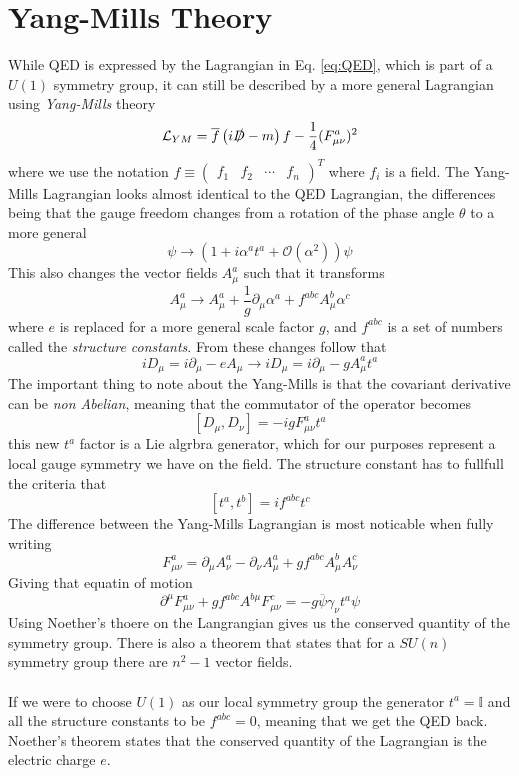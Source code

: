 \documentclass[12pt, a4paper]{book}
\begin{document}
\section{Yang-Mills Theory}
While QED is expressed by the Lagrangian in Eq. \ref{eq:QED}, which is part of a $U(1)$ symmetry group, it can still be described by a more general Lagrangian using \textit{Yang-Mills} theory
\begin{equation}\label{eq:YM_lag}
    \mathcal{L}_{YM} = \overline{f}\left(i\slashed{D} -m\right)f -\frac{1}{4}(F^a_{\mu\nu})^2
\end{equation}
where we use the notation $f\equiv\begin{pmatrix}f_1&f_2&\cdots&f_n\end{pmatrix}^T$ where $f_i$ is a field. The Yang-Mills Lagrangian looks almost identical to the QED Lagrangian, the differences being that the gauge freedom changes from a rotation of the phase angle $\theta$ to a more general
$$
\psi \rightarrow \left(1+i \alpha^a t^a + \mathcal{O}(\alpha^2)\right) \psi
$$ 
This also changes the vector fields $A_\mu^a$ such that it transforms 
$$
A_\mu^a \rightarrow A^a_\mu +\frac{1}{g}\partial_\mu\alpha^a +f^{abc}A_\mu^b\alpha^c
$$
where $e$ is replaced for a more general scale factor $g$, and $f^{abc}$ is a set of numbers called the \textit{structure constants}. From these changes follow that
$$
iD_\mu = i\partial_\mu -eA_\mu\rightarrow iD_\mu = i\partial_\mu -gA^a_\mu t^a
$$
The important thing to note about the Yang-Mills is that the covariant derivative can be \textit{non Abelian}, meaning that the commutator of the operator becomes
$$
\left[D_\mu,D_\nu\right] = -igF_{\mu\nu}^at^a
$$
this new $t^a$ factor is a Lie algrbra generator, which for our purposes represent a local gauge symmetry we have on the field. The structure constant has to fullfull the criteria that
\begin{equation}\label{eq:struc_const}
    [t^a,t^b]=if^{abc}t^c
\end{equation}The difference between the Yang-Mills Lagrangian is most noticable when fully writing
$$
F_{\mu\nu}^a = \partial_\mu A_\nu^a -\partial_\nu A_\mu^a +gf^{abc}A_\mu^b A_\nu^c
$$
Giving that equatin of motion
\begin{equation}\label{eq:YM_eq}
    \partial^\mu F^a_{\mu\nu} +gf^{abc}A^{b\mu}F^c_{\mu\nu} = -g\overline{\psi}\gamma_\nu t^a\psi
\end{equation}
Using Noether's thoere on the Langrangian gives us the conserved quantity of the symmetry group. There is also a theorem that states that for a $SU(n)$ symmetry group there are $n^2-1$ vector fields.\\
\\If we were to choose $U(1)$ as our local symmetry group the generator $t^a = \mathbb{I}$ and all the structure constants to be $f^{abc}=0$, meaning that we get the QED back. 
Noether's theorem states that the conserved quantity of the Lagrangian is the electric charge $e$.
\end{document}
